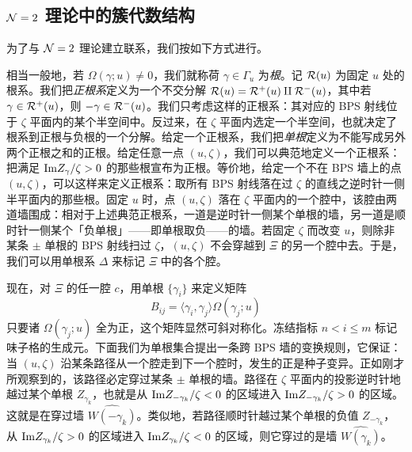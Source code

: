 \subsection{$\mathcal{N}=2$ 理论中的簇代数结构}
\label{subsec:Seeds-from-N=2}

为了与 $\mathcal{N}=2$ 理论建立联系，我们按如下方式进行。

相当一般地，若 $\Omega(\gamma;u)\not=0$，我们就称荷 $\gamma \in \Gamma_u$ 为\emph{根}。记 $\mathcal{R}(u)$ 为固定 $u$ 处的根系。我们把\emph{正根系}定义为一个不交分解 $\mathcal{R}(u) = \mathcal{R}^+(u) \amalg \mathcal{R}^-(u)$，其中若 $\gamma \in \mathcal{R}^+(u)$，则 $-\gamma \in \mathcal{R}^-(u)$。我们只考虑这样的正根系：其对应的 BPS 射线位于 $\zeta$ 平面内的某个半空间中。反过来，在 $\zeta$ 平面内选定一个半空间，也就决定了根系到正根与负根的一个分解。给定一个正根系，我们把\emph{单根}定义为不能写成另外两个正根之和的正根。给定任意一点 $(u,\zeta)$，我们可以典范地定义一个正根系：把满足 ${\rm Im}Z_{\gamma}/\zeta >0$ 的那些根宣布为正根。等价地，给定一个不在 BPS 墙上的点 $(u,\zeta)$，可以这样来定义正根系：取所有 BPS 射线落在过 $\zeta$ 的直线之逆时针一侧半平面内的那些根。固定 $u$ 时，点 $(u,\zeta)$ 落在 $\zeta$ 平面内的一个腔中，该腔由两道墙围成：相对于上述典范正根系，一道是逆时针一侧某个单根的墙，另一道是顺时针一侧某个「负单根」——即单根取负——的墙。若固定 $\zeta$ 而改变 $u$，则除非某条 $\pm$ 单根的 BPS 射线扫过 $\zeta$，$(u,\zeta)$ 不会穿越到 $\Xi$ 的另一个腔中去。于是，我们可以用单根系 $\Delta$ 来标记 $\Xi$ 中的各个腔。

现在，对 $\Xi$ 的任一腔 $c$，用单根 $\{\gamma_i\}$ 来定义矩阵
%
\begin{equation}
B_{ij} = \langle \gamma_i, \gamma_j\rangle   \Omega(\gamma_j;u)
\end{equation}
%
只要诸 $\Omega(\gamma_j;u)$ 全为正，这个矩阵显然可斜对称化。冻结指标 $n<i\leq m$ 标记味子格的生成元。下面我们为单根集合提出一条跨 BPS 墙的变换规则，它保证：当 $(u,\zeta)$ 沿某条路径从一个腔走到下一个腔时，发生的正是种子变异。正如刚才所观察到的，该路径必定穿过某条 $\pm$ 单根的墙。路径在 $\zeta$ 平面内的投影逆时针地越过某个单根 $Z_{\gamma_k}$，也就是从 ${\rm Im}Z_{-\gamma_k}/\zeta <0 $ 的区域进入 ${\rm Im}Z_{-\gamma_k}/\zeta > 0 $ 的区域。这就是在穿过墙 $\widehat{W(-\gamma_k)}$。类似地，若路径顺时针越过某个单根的负值 $Z_{-\gamma_k}$，从 ${\rm Im}Z_{\gamma_k}/\zeta >0 $ 的区域进入 ${\rm Im}Z_{\gamma_k}/\zeta < 0 $ 的区域，则它穿过的是墙 $\widehat{W(\gamma_k)}$。

